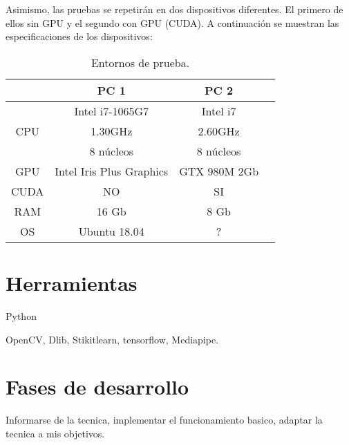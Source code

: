 Asimismo, las pruebas se repetirán en dos dispositivos diferentes. El primero de ellos sin GPU y el segundo con GPU (CUDA). A continuación se muestran las especificaciones de los dispositivos:

\begin{table}[h!]
	\begin{center}
		\begin{tabular}{ |c|c|c|c| } 
			\hline
			 & PC 1 & PC 2 \\
			\hline
			\multirow{3}{4em}{CPU} & Intel i7-1065G7 & Intel i7 \\ 
			& 1.30GHz & 2.60GHz \\ 
			& 8 núcleos & 8 núcleos \\ 
			\hline
			GPU & Intel Iris Plus Graphics  & GTX 980M 2Gb \\
			\hline
			CUDA & NO  & SI \\
			\hline
			RAM & 16 Gb & 8 Gb \\
			\hline
			OS & Ubuntu 18.04 & ? \\
			\hline
		\end{tabular}
		\caption{Entornos de prueba.}
		\label{tab:table1}
	\end{center}
\end{table}

\vspace{0.3cm}

\newpage
\section*{Herramientas}

Python

OpenCV, Dlib, Stikitlearn, tensorflow, Mediapipe.

\section*{Fases de desarrollo}

Informarse de la tecnica, implementar el funcionamiento basico, adaptar la tecnica a mis objetivos.